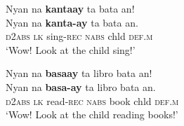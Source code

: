 \ea
Nyan  na  \textbf{kantaay}  ta  bata  an! \\\smallskip
\gll Nyan  na  \textbf{kanta-ay}  ta  bata  an. \\
\textsc{d2abs}  \textsc{lk}  sing-\textsc{rec}  \textsc{nabs}  chld  \textsc{def.m} \\
\glt ‘Wow! Look at the child sing!’
\z

\ea
\label{bkm:Ref118453570}
Nyan  na  \textbf{basaay}  ta  libro  bata  an! \\\smallskip
\gll Nyan  na  \textbf{basa-ay}  ta  libro  bata  an. \\
\textsc{d2abs}  \textsc{lk}  read-\textsc{rec}  \textsc{nabs}  book  chld  \textsc{def.m} \\
\glt ‘Wow! Look at the child reading books!’
\z
    
